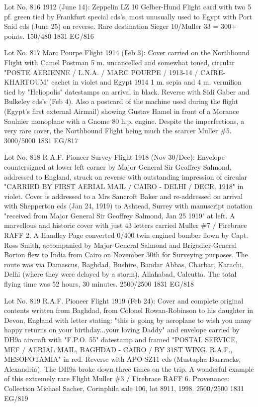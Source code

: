\documentclass[justified]{tufte-book}
\begin{document}
%
{Lot No. 816
1912 (June 14): Zeppelin LZ 10 Gelber-Hund Flight card with two 5 pf. green tied by Frankfurt special cds's, most unusually used to Egypt with Port Said cds (June 25) on reverse. Rare destination Sieger 10/Muller 33 = 300+ points. 150/480
}%
{1831}%
{EG/816}%
{}%
{}
{}%
{}


%
{Lot No. 817
Marc Pourpe Flight 1914 (Feb 3): Cover carried on the Northbound Flight with Camel Postman 5 m. uncancelled and somewhat toned, circular "POSTE AERIENNE / L.N.A. / MARC POURPE / 1913-14 / CAIRE-KHARTOUM" cachet in violet and Egypt 1914 1 m. sepia and 4 m. vermilion tied by "Heliopolis" datestamps on arrival in black. Reverse with Sidi Gaber and Bulkeley cds's (Feb 4). Also a postcard of the machine used during the flight (Egypt's first external Airmail) showing Gustav Hamel in front of a Morance Saulnier monoplane with a Gnome 80 h.p. engine. Despite the imperfections, a very rare cover, the Northbound Flight being much the scarcer Muller \#5. 3000/5000}%
{1831}%
{EG/817}%
{}%
{}
{}%
{}


%
{Lot No. 818
R A.F. Pioneer Survey Flight 1918 (Nov 30/Dec): Envelope countersigned at lower left corner by Major General Sir Geoffrey Salmond, addressed to England, struck on reverse with outstanding impression of circular "CARRIED BY FIRST AERIAL MAIL / CAIRO - DELHI / DECR. 1918" in violet. Cover is addressed to a Mrs Sancroft Baker and re-addressed on arrival with Shepperton cds (Jan 24, 1919) to Ashtead, Surrey with manuscript notation "received from Major General Sir Geoffrey Salmond, Jan 25 1919" at left. A marvellous and historic cover with just 43 letters carried Muller \#7 / Firebrace RAFF 2. A Handley Page converted 0/400 twin engined bomber flown by Capt. Ross Smith, accompanied by Major-General Salmond and Brigadier-General Borton flew to India from Cairo on November 30th for Surveying purposes. The route was via Damascus, Baghdad, Bushire, Bandar Abbas, Charbar, Karachi, Delhi (where they were delayed by a storm), Allahabad, Calcutta. The total flying time was 52 hours, 30 minutes. 2500/2500}%
{1831}%
{EG/818}%
{}%
{}
{}%
{}


%
{Lot No. 819
R.A.F. Pioneer Flight 1919 (Feb 24): Cover and complete original contents written from Baghdad, from Colonel Rowan-Robinson to his daughter in Devon, England with letter stating: "this is going by aeroplane to wish you many happy returns on your birthday...your loving Daddy" and envelope carried by DH9a aircraft with "F.P.O. 55" datestamp and framed "POSTAL SERVICE, MEF / AERIAL MAIL, BAGHDAD - CAIRO / BY 31ST WING. R.A.F., MESOPOTAMIA" in red. Reverse with APO-SZ11 cds (Mustapha Barrracks, Alexandria). The DH9a broke down three times on the trip. A wonderful example of this extremely rare Flight Muller \#3 / Firebrace RAFF 6. Provenance: Collection Michael Sacher, Corinphila sale 106, lot 8911, 1998. 2500/2500}%
{1831}%
{EG/819}%
{}%
{}
{}%
{}
\end{document}

